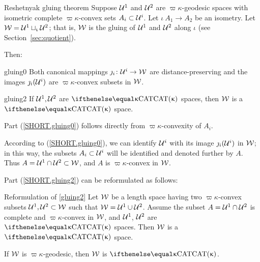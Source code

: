 \begin{thm}{Reshetnyak gluing theorem}\label{thm:gluing}
Suppose 
$\mathcal{U}^1$ and $\mathcal{U}^2$ are %
$\varpi\kappa$-geodesic spaces 
with isometric complete $\varpi\kappa$-convex sets $A_i\subset\spc{U}^i$.  Let $\iota\:A_1\to A_2$ be an isometry.
Let $\mathcal{W}=\mathcal{U}^1\sqcup_{\upiota}\mathcal{U}^2$;
that is, $\mathcal{W}$ is the gluing of $\mathcal{U}^1$ and  $\mathcal{U}^2$ along $\iota$ (see Section~\ref{sec:quotient}).

Then: 
\begin{subthm}{gluing0}
Both canonical mappings $\jmath_i\:\spc{U}^i\to\spc{W}$ are distance-preserving 
and the images $\jmath_i(\mathcal{U}^i)$ are $\varpi\kappa$-convex subsets in $\mathcal{W}$.
\end{subthm}

\begin{subthm}{gluing2}
If $\mathcal{U}^1, \mathcal{U}^2$ are $\CAT\kappa$ spaces,
then $\mathcal{W}$ is a $\CAT\kappa$ space.
\end{subthm} 
\end{thm}

Part (\ref{SHORT.gluing0})
follows directly from $\varpi\kappa$-convexity of $A_i$.

According to (\ref{SHORT.gluing0}),
we can identify $\mathcal{U}^i$ with its image $\jmath_i(\mathcal{U}^i)$ in $\mathcal{W}$;
in this way, the subsets $A_i\subset \spc{U}^i$ will be identified and denoted further by $A$.
Thus   $A=\spc{U}^1\cap \spc{U}^2\subset \spc{W}$,
and $A$ is $\varpi\kappa$-convex in $\mathcal{W}$.

Part (\ref{SHORT.gluing2}) can be reformulated as follows:

\begin{thm}{Reformulation of \ref{gluing2}}
Let $\mathcal{W}$ be a 
length space having two 
$\varpi\kappa$-convex subsets $\spc{U}^1,\spc{U}^2\subset\spc{W}$ such that
$\spc{W}=\spc{U}^1\cup\spc{U}^2$.
Assume the subset $A=\spc{U}^1\cap \spc{U}^2$ is complete and $\varpi\kappa$-convex in $\mathcal{W}$, and $\mathcal{U}^1$, $\mathcal{U}^2$ are $\CAT\kappa$ spaces.
Then $\mathcal{W}$ is a $\CAT\kappa$ space.
\end{thm}

\begin{clm}{}\label{clm:geod-gluing}
If $\mathcal{W}$ is $\varpi\kappa$-geodesic, then $\mathcal{W}$ is $\CAT\kappa$.
\end{clm}


